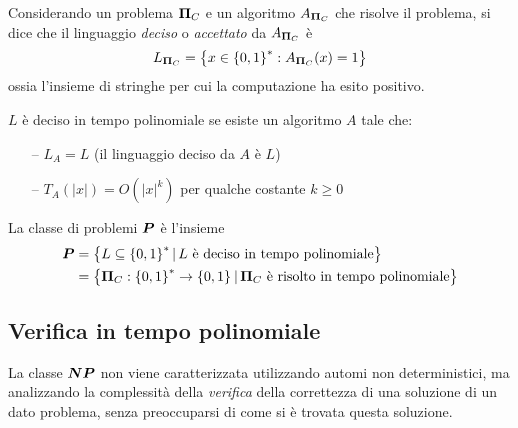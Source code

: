 Considerando un problema $\bm{\Pi}{}_{C}$ e un algoritmo $A_{\bm{\Pi}{}_{C}}$ che risolve il problema, si dice che il linguaggio \emph{deciso} o \emph{accettato} da $A_{\bm{\Pi}{}_{C}}$ è
\begin{equation*}
    L_{\bm{\Pi}{}_{C}} = \left\{ x \in \left\{0,1\right\}^{*} : A_{\bm{\Pi}{}_{C}}(x) = 1 \right\}
\end{equation*}
ossia l'insieme di stringhe per cui la computazione ha esito positivo.

\begin{definition}
    \label{def:tempopoli}
    $L$ è deciso in tempo polinomiale se esiste un algoritmo $A$ tale che:
    \begin{itemize}[itemsep=0pt]
        \item[--] $L_A = L$ (il linguaggio deciso da $A$ è $L$)
        \item[--] $T_A(|x|) = O(|x|^k)$ per qualche costante $k \geq 0$
    \end{itemize}
\end{definition}

\begin{definition}[Classe $\bp$]
    \label{def:classep}
    La classe di problemi $\bm{P}{}$ è l'insieme
    \begin{align*}
        \bm{P}{} &= \left\{ L \subseteq \left\{0,1\right\}^{*} |\, L \text{ è deciso in tempo polinomiale}\right\} \\
        &= \left\{ \bm{\Pi}{}_{C} : \left\{0,1\right\}^{*} \to \left\{0,1\right\}^{} |\, \bm{\Pi}{}_C \text{ è risolto in tempo polinomiale} \right\}
    \end{align*}
\end{definition}


\subsection{Verifica in tempo polinomiale}

La classe $\bm{NP}{}$ non viene caratterizzata utilizzando automi non deterministici, ma analizzando la complessità della \emph{verifica} della correttezza di una soluzione di un dato problema, senza preoccuparsi di come si è trovata questa soluzione.

